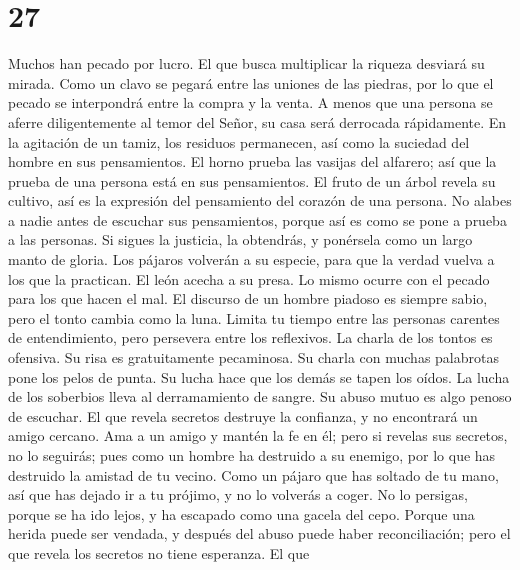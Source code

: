 \hypertarget{section-26}{%
\section{27}\label{section-26}}

 Muchos han pecado por lucro. El que busca multiplicar la
riqueza desviará su mirada.  Como un clavo se pegará entre
las uniones de las piedras, por lo que el pecado se interpondrá entre la
compra y la venta.  A menos que una persona se aferre
diligentemente al temor del Señor, su casa será derrocada rápidamente.
 En la agitación de un tamiz, los residuos permanecen, así
como la suciedad del hombre en sus pensamientos.  El horno
prueba las vasijas del alfarero; así que la prueba de una persona está
en sus pensamientos.  El fruto de un árbol revela su
cultivo, así es la expresión del pensamiento del corazón de una persona.
 No alabes a nadie antes de escuchar sus pensamientos,
porque así es como se pone a prueba a las personas.  Si
sigues la justicia, la obtendrás, y ponérsela como un largo manto de
gloria.  Los pájaros volverán a su especie, para que la
verdad vuelva a los que la practican.  El león acecha a
su presa. Lo mismo ocurre con el pecado para los que hacen el mal.
 El discurso de un hombre piadoso es siempre sabio, pero
el tonto cambia como la luna.  Limita tu tiempo entre las
personas carentes de entendimiento, pero persevera entre los reflexivos.
 La charla de los tontos es ofensiva. Su risa es
gratuitamente pecaminosa.  Su charla con muchas
palabrotas pone los pelos de punta. Su lucha hace que los demás se tapen
los oídos.  La lucha de los soberbios lleva al
derramamiento de sangre. Su abuso mutuo es algo penoso de escuchar.
 El que revela secretos destruye la confianza, y no
encontrará un amigo cercano.  Ama a un amigo y mantén la
fe en él; pero si revelas sus secretos, no lo seguirás; 
pues como un hombre ha destruido a su enemigo, por lo que has destruido
la amistad de tu vecino.  Como un pájaro que has soltado
de tu mano, así que has dejado ir a tu prójimo, y no lo volverás a
coger.  No lo persigas, porque se ha ido lejos, y ha
escapado como una gacela del cepo.  Porque una herida
puede ser vendada, y después del abuso puede haber reconciliación; pero
el que revela los secretos no tiene esperanza.  El que
